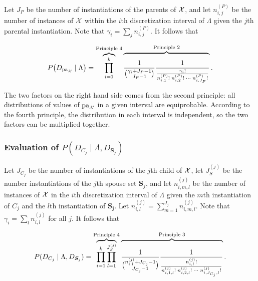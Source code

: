 Let $J_P$ be the number of instantiations of the parents of $\mathcal{X}$, and let $n^{(P)}_{i,j}$ be the number of instances of $\mathcal{X}$ within the $i$th discretization interval of $\Lambda$ given the $j$th parental instantiation.
Note that $\gamma_i = \sum_j n^{(P)}_{i,j}$.
It follows that

\begin{equation}
  \label{eq:likelihood_one}
  P\paren{D_{\Pa_{\cX}} \mid \Lambda} = \overbrace{\prod_{i=1}^k}^{\text{Principle 4}}
    \overbrace{\rule{0pt}{2em}
      \frac{1}{{{\gamma_i + J_P - 1}\choose{J_P - 1}}}
      \frac{1}{
        \frac{
          {\gamma_i}!
        }{
          {n^{({P})}_{i,1}}! \; {n^{({P})}_{i,2}}! \; \cdots \; {n^{({P})}_{i,J_P}}!
        }
      }
    }^{\text{Principle 2}}\text{.}
\end{equation}

The two factors on the right hand side comes from the second principle: all distributions of values of $\operatorname{pa}_{\mathcal{X}}$ in a given interval are equiprobable.
According to the fourth principle, the distribution in each interval is independent, so the two factors can be multiplied together.

\subsubsection{Evaluation of $P(D_{C_j} \mid \Lambda, D_{\bm{S}_j})$}
Let $J_{C_j}$ be the number of instantiations of the $j$th child of $\mathcal{X}$, let $J_S^{(j)}$ be the number instantiations of the $j$th spouse set $\bm{S}_j$, and let $n^{(j)}_{i,m,l}$ be the number of instances of $\mathcal{X}$ in the $i$th discretization interval of $\Lambda$ given the $m$th instantiation of $C_j$ and the $l$th instantiation of $\boldsymbol{S_j}$.
Let ${n^{(j)}_{i,l} = \sum_{m=1}^{J_j} n^{(j)}_{i,m,l}}$.
Note that ${\gamma_i = \sum_l n^{(j)}_{i,l}}$ for all $j$.
It follows that

\begin{equation}
  \label{eq:likelihood_two}
  P(D_{C_j} \mid \Lambda, D_{\bm{S}_j}) =
  \overbrace{\prod_{i=1}^{k} \prod_{l=1}^{J_S^{(j)}}}^{\text{Principle 4}}
    \overbrace{\rule{0pt}{2.3em}
      {
        \frac{1}{
          {{n^{(j)}_{i,l} + J_{C_j} - 1}\choose{J_{C_j}-1}}}
        }
        {\frac{
          1
        }{
          \frac{
            {n^{(j)}_{i,l}}!
          }{
            {n^{(j)}_{i,1,l}!} \; {n^{(j)}_{i,2,l}!} \; \cdots \; {n^{(j)}_{i,J_{C_j},l}!}
          }
        }
      }
    }^{\text{Principle 3}}
    \text{.}
\end{equation}

